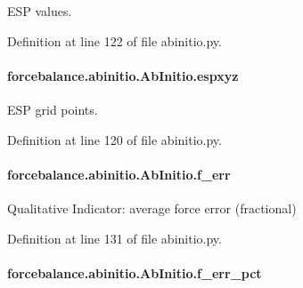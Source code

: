 E\-S\-P values. 



Definition at line 122 of file abinitio.\-py.

\hypertarget{classforcebalance_1_1abinitio_1_1AbInitio_a8be2d088afb344036aae989ca3cbcc41}{
\paragraph[{espxyz}]{\setlength{\rightskip}{0pt plus 5cm}forcebalance.\-abinitio.\-Ab\-Initio.\-espxyz\hspace{0.3cm}{\ttfamily [inherited]}}}\label{classforcebalance_1_1abinitio_1_1AbInitio_a8be2d088afb344036aae989ca3cbcc41}


E\-S\-P grid points. 



Definition at line 120 of file abinitio.\-py.

\hypertarget{classforcebalance_1_1abinitio_1_1AbInitio_a176fb2b013ecc5ab451fd3b190414c4d}{
\paragraph[{f\-\_\-err}]{\setlength{\rightskip}{0pt plus 5cm}forcebalance.\-abinitio.\-Ab\-Initio.\-f\-\_\-err\hspace{0.3cm}{\ttfamily [inherited]}}}\label{classforcebalance_1_1abinitio_1_1AbInitio_a176fb2b013ecc5ab451fd3b190414c4d}


Qualitative Indicator\-: average force error (fractional) 



Definition at line 131 of file abinitio.\-py.

\hypertarget{classforcebalance_1_1abinitio_1_1AbInitio_ab6ee932ad4689f538c746310939dd0bc}{
\paragraph[{f\-\_\-err\-\_\-pct}]{\setlength{\rightskip}{0pt plus 5cm}forcebalance.\-abinitio.\-Ab\-Initio.\-f\-\_\-err\-\_\-pct\hspace{0.3cm}{\ttfamily [inherited]}}}\label{classforcebalance_1_1abinitio_1_1AbInitio_ab6ee932ad4689f538c746310939dd0bc}


